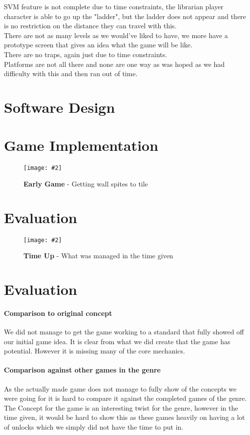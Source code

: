 \documentclass[10pt, a4paper]{article}
\newcommand{\figuremacro}[5]{
    \begin{figure}[#1]
        \centering
        \texttt{[image: \#2]}
        \caption[#3]{\textbf{#3}#4}
        \label{fig:#2}
    \end{figure}
}
\begin{document}
	SVM feature is not complete due to time constraints, the librarian player character is able to go up the "ladder", but the ladder does not appear and there is no restriction on the distance they can travel with this.\\
	
	There are not as many levels as we would've liked to have, we more have a prototype screen that gives an idea what the game will be like.\\
	
	There are no traps, again just due to time constraints.\\
	
	Platforms are not all there and none are one way as was hoped as we had difficulty with this and then ran out of time.
	
	
	\section{Software Design}
	
	\section{Game Implementation}
	
	\figuremacro{h}{Walls}{Early Game}{ - Getting wall spites to tile}{1.0}
	\section{Evaluation}
	\figuremacro{h}{game}{Time Up}{ - What was managed in the time given}{1.0}
	\section{Evaluation}
	
	\paragraph{Comparison to original concept}
	We did not manage to get the game working to a standard that fully showed off our initial game idea. It is clear from what we did create that the game has potential. However it is missing many of the core mechanics.
	\paragraph{Comparison against other games in the genre}
	As the actually made game does not manage to fully show of the concepts we were going for it is hard to compare it against the completed games of the genre. The Concept for the game is an interesting twist for the genre, however in the time given, it would be hard to show this as these games heavily on having a lot of unlocks which we simply did not have the time to put in.
\end{document}

